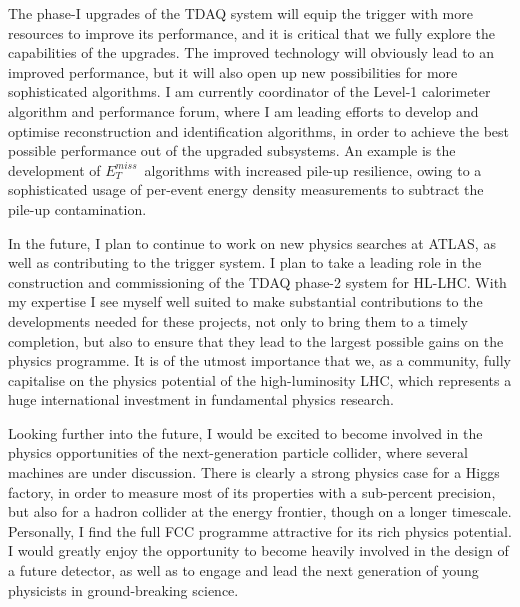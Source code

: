 \documentclass[11pt,a4paper,sans]{moderncv}        %
\newcommand{\met}{\ensuremath{E_{{T}}^{{miss}}}}
\begin{document}
The phase-I upgrades of the TDAQ system will equip the trigger with more resources to improve its performance, and it is critical that we fully explore the capabilities of the upgrades. The improved technology will obviously lead to an improved performance, but it will also open up new possibilities for more sophisticated algorithms.
I am currently coordinator of the Level-1 calorimeter algorithm and performance forum, where I am leading efforts to develop and optimise reconstruction and identification algorithms, in order to achieve the best possible performance out of the upgraded subsystems. An example is the development of \met\ algorithms with increased pile-up resilience, owing to a sophisticated usage of per-event energy density measurements to subtract the pile-up contamination. 
\newline

In the future, I plan to continue to work on new physics searches at ATLAS, as well as contributing to the trigger system. 
I plan to take a leading role in the construction and commissioning of the TDAQ phase-2 system for HL-LHC.
With my expertise I see myself well suited to make substantial contributions to the developments needed for these projects, not only to bring them to a timely completion, but also to ensure that they lead to the largest possible gains on the physics programme. 
It is of the utmost importance that we, as a community, fully capitalise on the physics potential of the high-luminosity LHC, 
which represents a huge international investment in fundamental physics research.
\newline

Looking further into the future, I would be excited to become involved in the physics opportunities of the next-generation particle collider, where several machines are under discussion. There is clearly a strong physics case for a Higgs factory, in order to measure most of its properties with a sub-percent precision, but also for a hadron collider at the energy frontier, though on a longer timescale. Personally, I find the full FCC programme attractive for its rich physics potential. 
I would greatly enjoy the opportunity to become heavily involved in the design of a future detector, as well as to engage and lead the next generation of young physicists in ground-breaking science.
\newline
\end{document}
